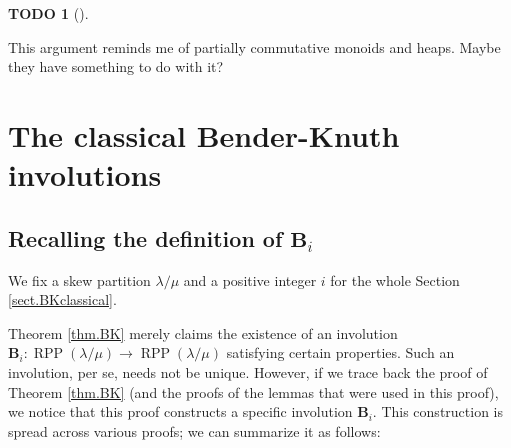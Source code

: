 \documentclass[numbers=enddot,12pt,final,onecolumn,notitlepage]{scrartcl}%
\theoremstyle{definition}
\newtheorem{quest}[theo]{TODO}
\newenvironment{todo}[1][]
{\begin{quest}[#1]\begin{leftbar}}
{\end{leftbar}\end{quest}}
\begin{document}
\begin{todo}
This argument reminds me of partially commutative monoids and heaps. Maybe
they have something to do with it?
\end{todo}

\section{\label{sect.BKclassical}The classical Bender-Knuth involutions}

\subsection{Recalling the definition of $\mathbf{B}_{i}$}

We fix a skew partition $\lambda/\mu$ and a positive integer $i$ for the whole
Section \ref{sect.BKclassical}.

Theorem \ref{thm.BK} merely claims the existence of an involution
$\mathbf{B}_{i}:\operatorname*{RPP}\left(  \lambda/\mu\right)  \rightarrow
\operatorname*{RPP}\left(  \lambda/\mu\right)  $ satisfying certain
properties. Such an involution, per se, needs not be unique. However, if we
trace back the proof of Theorem \ref{thm.BK} (and the proofs of the lemmas
that were used in this proof), we notice that this proof constructs a specific
involution $\mathbf{B}_{i}$. This construction is spread across various
proofs; we can summarize it as follows:
\end{document}
